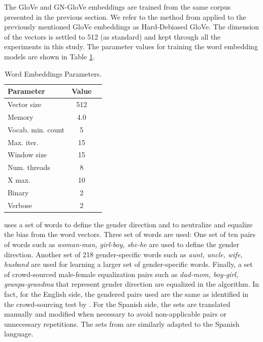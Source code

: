 \documentclass[11pt,a4paper]{article}
\begin{document}
The GloVe and GN-GloVe embeddings are trained from the same corpus presented in the previous section.
We refer to the method from \citet{bolukbasi2016} applied to the previously mentioned GloVe embeddings as Hard-Debiased GloVe.
The dimension of the vectors is settled to 512 (as standard) and kept through all the experiments in this study. The parameter values for training the word embedding models are shown in Table \ref{tab:param-wemb}. 

\begin{table}[h!]
\centering
\begin{tabular}{lcc}  
\toprule
Parameter & Value &  \\
\midrule
Vector size & 512 \\
Memory & 4.0 \\
Vocab. min. count & 5 \\
Max. iter. & 15 \\
Window size & 15 \\
Num. threads & 8 \\
X max. & 10 \\
Binary & 2 \\
Verbose & 2 \\
\bottomrule
\end{tabular}
\caption{Word Embeddings Parameters.}
\label{tab:param-wemb}
\end{table}



\citet{bolukbasi2016} uses a set of words to define the gender direction and to neutralize and equalize the bias from the word vectors.
Three set of words are used:
One set of ten pairs of words such as \textit{woman-man, girl-boy, she-he} are used to define the gender direction.
Another set of 218 gender-specific words such as \textit{aunt, uncle, wife, husband} are used for learning a larger set of gender-specific words.
Finally, a set of crowd-sourced male-female equalization pairs such as \textit{dad-mom, boy-girl, granpa-grandma} that represent gender direction are equalized in the algorithm.
In fact, for the English side, the gendered pairs used are the same as identified in the crowd-sourcing test by \citet{bolukbasi2016}.
For the Spanish side, the sets are translated manually and modified when necessary to avoid non-applicable pairs or unnecessary repetitions. 
The sets from \citet{DBLP:conf/emnlp/ZhaoZLWC18} are similarly adapted to the Spanish language.
\end{document}
